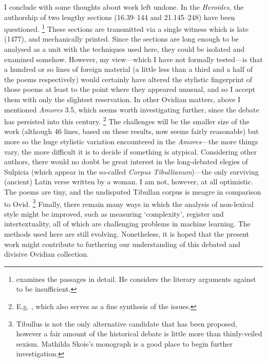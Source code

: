 \documentclass[twocolumn, switch, a4paper]{article} %
\begin{document}
I conclude with some thoughts about work left undone. In the \emph{Heroides},
the authorship of two lengthy sections (16.39--144 and 21.145--248) have been
questioned.%
%
    \footnote{ examines the passages in detail. He
    considers the literary arguments against to be insufficient.}
%
These sections are transmitted via a single witness which is late (1477), and
mechanically printed. Since the sections are long enough to be analysed as a
unit with the techniques used here, they could be isolated and examined
somehow. However, my view---which I have not formally tested---is that a
hundred or so lines of foreign material (a little less than a third and a half
of the poems respectively) would certainly have altered the stylistic
fingerprint of those poems at least to the point where they appeared unusual,
and so I accept them with only the slightest reservation. In other Ovidian
matters, above I mentioned \emph{Amores} 3.5, which seems worth investigating
further, since the debate has persisted into this century.%
%
    \footnote{E.g. , which also serves as a
    fine synthesis of the issues.}
%
The challenges will be the smaller size of the work (although 46 lines, based
on these results, now seems fairly reasonable) but more so the huge stylistic
variation encountered in the \emph{Amores}---the more things vary, the more
difficult it is to decide if something is atypical. Considering other authors,
there would no doubt be great interest in the long-debated elegies of Sulpicia
(which appear in the so-called \emph{Corpus Tibullianum})---the only surviving
(ancient) Latin verse written by a woman. I am not, however, at all
optimistic. The poems are tiny, and the undisputed Tibullan corpus is meagre
in comparison to Ovid.%
%
    \footnote{Tibullus is not the only alternative candidate that has been
    proposed, however a fair amount of the historical debate is little more
    than thinly-veiled sexism. Mathilda Skoie's \citeyear{skoie2002reading}
    monograph is a good place to begin further investigation.}
%
Finally, there remain many ways in which the analysis of non-lexical style
might be improved, such as measuring `complexity', register and
intertextuality, all of which are challenging problems in machine learning.
The methods used here are still evolving. Nonetheless, it is hoped that the
present work might contribute to furthering our understanding of this debated
and divisive Ovidian collection.

\end{document}
